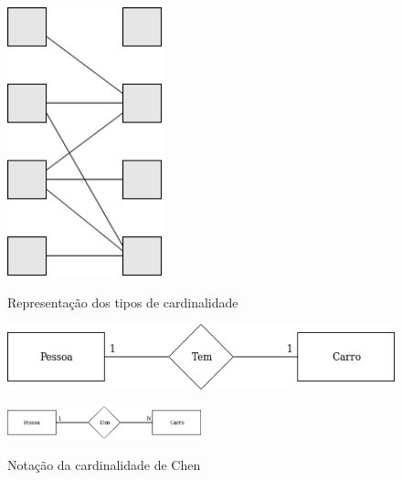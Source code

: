 \documentclass[11pt,twoside,a4paper]{report}
\begin{document}
\begin{figure}[H]
\begin{minipage}{0.3\textwidth}
\begin{center}
			\label{fig:der52}
		\end{center}
	\end{minipage}%
	\begin{minipage}{0.3\textwidth}
		\vspace{-.5cm}
		\begin{center}
			\includegraphics[width=0.4\textwidth]{notacao10} %
			\label{fig:der53}
		\end{center}
	\end{minipage}
	\caption{Representação dos tipos de cardinalidade}
	\label{fig:der5}
\end{figure}
\vspace{.5cm}
\begin{figure}[H]
	\centering
	\begin{minipage}{1\textwidth}
		\begin{center}
			\includegraphics[width=.5\textwidth]{notacao11} %
			\label{fig:der61}
		\end{center}
	\end{minipage}
	\begin{minipage}{1\textwidth}
		\begin{center}
			\includegraphics[width=0.5\textwidth]{notacao12} %
			\label{fig:der62}
		\end{center}
	\end{minipage}
	\caption{Notação da cardinalidade de Chen}
	\label{fig:der6}
\end{figure}
\end{document}
